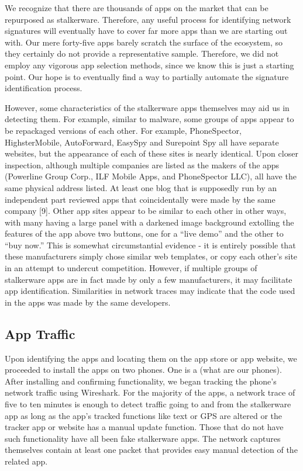 \documentclass[acmtog]{acmart}
\begin{document}
We recognize that there are thousands of apps on the market that can be 
repurposed as stalkerware. Therefore, any useful process for identifying 
network signatures will eventually have to cover far more apps than we are 
starting out with. Our mere forty-five apps barely scratch the surface of the 
ecosystem, so they certainly do not provide a representative sample. Therefore, 
we did not employ any vigorous app selection methods, since we know this is 
just a starting point. Our hope is to eventually find a way to partially 
automate the signature identification process.

However, some characteristics of the stalkerware apps themselves may aid us in 
detecting them. For example, similar to malware, some groups of apps appear to 
be repackaged versions of each other. For example, PhoneSpector, 
HighsterMobile, AutoForward, EasySpy and Surepoint Spy all have separate 
websites, but the appearance of each of these sites is nearly identical. Upon 
closer inspection, although multiple companies are listed as the makers of the 
apps (Powerline Group Corp., ILF Mobile Apps, and PhoneSpector LLC), all have 
the same physical address listed. At least one blog that is supposedly run by 
an independent part reviewed apps that coincidentally were made by the same 
company [9]. Other app sites appear to be similar to each other in other ways, 
with many having a large panel with a darkened image background extolling the 
features of the app above two buttons, one for a “live demo” and the other to 
“buy now.” This is somewhat circumstantial evidence - it is entirely possible 
that these manufacturers simply chose similar web templates, or copy each 
other’s site in an attempt to undercut competition. However, if multiple groups 
of stalkerware apps are in fact made by only a few manufacturers, it may 
facilitate app identification. Similarities in network traces may indicate that 
the code used in the apps was made by the same developers.

\subsection{App Traffic}

Upon identifying the apps and locating them on the app store or app website, we 
proceeded to install the apps on two phones. One is a (what are our phones). 
After installing and confirming functionality, we began tracking the phone's 
network traffic using Wireshark. For the majority of the apps, a network trace 
of five to ten minutes is enough to detect traffic going to and from the 
stalkerware app as long as the app's tracked functions like text or GPS are 
altered or the tracker app or website has a manual update function. Those that 
do not have such functionality have all been fake stalkerware apps. The network 
captures themselves contain at least one packet that provides easy manual 
detection of the related app.
\end{document}
